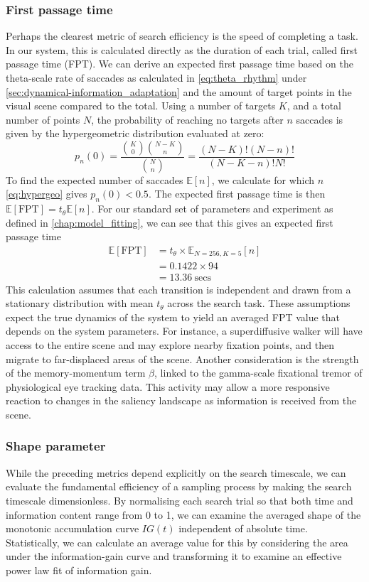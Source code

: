 \subsubsection*{First passage time}
Perhaps the clearest metric of search efficiency is the speed of completing a task. In our system, this is calculated directly as the duration of each trial, called first passage time (FPT). We can derive an expected first passage time based on the theta-scale rate of saccades as calculated in \cref{eq:theta_rhythm} under \cref{sec:dynamical-information_adaptation} and the amount of target points in the visual scene compared to the total. Using a number of targets $K$, and a total number of points $N$, the probability of reaching no targets after $n$ saccades is given by the hypergeometric distribution evaluated at zero:
\begin{equation} \label{eq:hypergeo}
    p_n(0) = \frac{\binom{K}{0}\binom{N-K}{n}}{\binom{N}{n}} = \frac{(N-K)!(N-n)!}{(N-K-n)!N!}
\end{equation}
To find the expected number of saccades $\mathbb{E}[n]$, we calculate for which $n$ \cref{eq:hypergeo} gives $p_n(0)<0.5$. The expected first passage time is then $\mathbb{E}[\text{FPT}] = t_{\theta} \mathbb{E}[n]$. For our standard set of parameters and experiment as defined in \cref{chap:model_fitting}, we can see that this gives an expected first passage time
\begin{align}
    \mathbb{E}[\text{FPT}] &= t_{\theta} \times \mathbb{E}_{N=256,K=5}[n] \nonumber \\
    &= 0.1422 \times 94 \nonumber \\
    &= 13.36 \ \text{secs}\label{eq:fpt_expected}
\end{align}
This calculation assumes that each transition is independent and drawn from a stationary distribution with mean $t_{\theta}$ across the search task. These assumptions expect the true dynamics of the system to yield an averaged FPT value that depends on the system parameters. For instance, a superdiffusive walker will have access to the entire scene and may explore nearby fixation points, and then migrate to far-displaced areas of the scene. Another consideration is the strength of the memory-momentum term $\beta$, linked to the gamma-scale fixational tremor of physiological eye tracking data. This activity may allow a more responsive reaction to changes in the saliency landscape as information is received from the scene.
\subsubsection*{Shape parameter}
While the preceding metrics depend explicitly on the search timescale, we can evaluate the fundamental efficiency of a sampling process by making the search timescale dimensionless. By normalising each search trial so that both time and information content range from 0 to 1, we can examine the averaged shape of the monotonic accumulation curve $IG(t)$ independent of absolute time. Statistically, we can calculate an average value for this by considering the area under the information-gain curve and transforming it to examine an effective power law fit of information gain.
